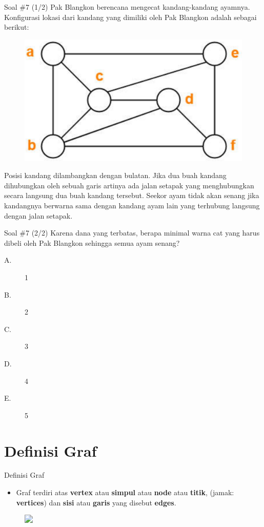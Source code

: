 \documentclass[english,t]{beamer}
\begin{document}
	\begin{frame}{Soal \#7 (1/2)}
		Pak Blangkon berencana mengecat kandang-kandang ayamnya. Konfigurasi lokasi dari kandang yang dimiliki oleh Pak Blangkon adalah sebagai berikut:
		\begin{figure}[!ht]
			\centering
			\includegraphics[scale=.15]{images/map-coloring}
		\end{figure}
		Posisi kandang dilambangkan dengan bulatan. Jika dua buah kandang dihubungkan oleh sebuah garis artinya ada jalan setapak yang menghubungkan secara langsung dua buah kandang tersebut. Seekor ayam tidak akan senang jika kandangnya berwarna sama dengan kandang ayam lain yang terhubung langsung dengan jalan setapak. 		
	\end{frame}

	\begin{frame}{Soal \#7 (2/2)}
		Karena dana yang terbatas, berapa minimal warna cat yang harus dibeli oleh Pak Blangkon sehingga semua ayam senang?
		\begin{description}
			\item[A.] 1
			\item[B.] 2
			\item[C.] 3
			\item[D.] 4
			\item[E.] 5
		\end{description}		
	\end{frame}

\section{Definisi Graf}
\begin{frame}{Definisi Graf}
	\begin{itemize}
		\item<2-> Graf terdiri atas \textbf{vertex} atau \textbf{simpul} atau \textbf{node} atau \textbf{titik}, (jamak: \textbf{vertices}) dan \textbf{sisi} atau \textbf{garis} yang disebut \textbf{edges}.		 
	\end{itemize}
	\begin{figure}[ht]
		\includegraphics<3->[scale=.25]{images/sifat-sifat-vertex-sisi}
	\end{figure}
\end{frame}
\end{document}
